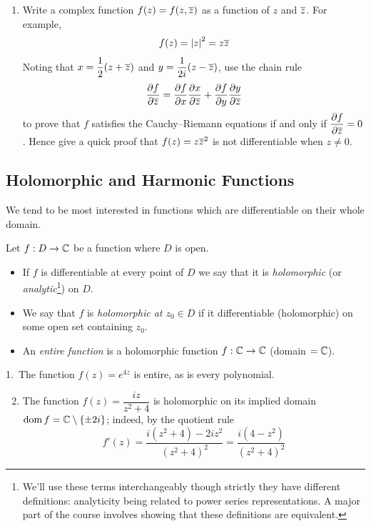 \begin{exercises*}{}
\begin{enumerate}
  \item Write a complex function $f(z)=f(z,\cl z)$ as a function of $z$ and $\cl z$. For example,
  \[f(z)=\nm z^2=z\cl z\]
  Noting that $\displaystyle x=\frac 12(z+\cl z)$ and $\displaystyle y=\frac 1{2i}(z-\cl z)$, use the chain rule
  \[\partials[f]{\cl z}=\partials[f]{x}\partials[x]{\cl z}+\partials[f]{y}\partials[y]{\cl z}\]
  to prove that $f$ satisfies the Cauchy--Riemann equations if and only if $\displaystyle \partials[f]{\cl z}=0$.\smallbreak
  Hence give a quick proof that $f(z)=z\cl z^2$ is not differentiable when $z\neq 0$. 
\end{enumerate}
\end{exercises*}

\clearpage


\subsection[Holomorphic and Harmonic Functions]{Holomorphic and Harmonic Functions}\label{subsec:analytic}%

We tend to be most interested in functions which are differentiable on their whole domain.

\begin{defn}{}{}
Let $f:D\to\C$ be a function where $D$ is open.
\begin{itemize}
  \item If $f$ is differentiable at every point of $D$ we say that it is \emph{holomorphic} (or \emph{analytic}\footnote{We'll use these terms interchangeably though strictly they have different definitions: analyticity being related to power series representations. A major part of the course involves showing that these definitions are equivalent.}) on $D$.
  \item We say that $f$ is \emph{holomorphic at $z_0\in D$} if it differentiable (holomorphic) on some open set containing $z_0$.
  \item An \emph{entire function} is a holomorphic function $f:\C\to\C$ (domain $=\C$).
\end{itemize}
\end{defn}

\begin{examples}{}{}
\hangindent\leftmargini
\textup{1.}\ The function $f(z)=e^{4z}$ is entire, as is every polynomial.
\begin{enumerate}\setcounter{enumi}{1}
  \item The function $f(z)=\dfrac{iz}{z^2+4}$ is holomorphic on its implied domain $\dom f=\C\setminus\{\pm 2i\}$; indeed, by the quotient rule
  \[f'(z)=\frac{i(z^2+4)-2iz^2}{(z^2+4)^2} =\frac{i(4-z^2)}{(z^2+4)^2}\]
\end{enumerate}
\end{examples}


